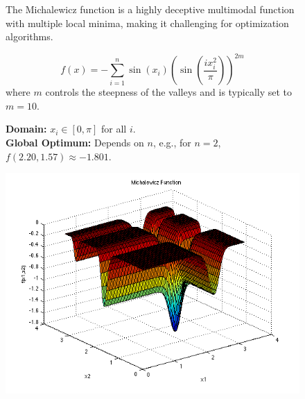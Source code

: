 \begin{figure}[H]
    \centering
    \begin{minipage}{0.65\textwidth}
        The Michalewicz function is a highly deceptive multimodal function with multiple local minima, making it challenging for optimization algorithms.
        
        \begin{equation}
            f(x) = -\sum_{i=1}^{n} \sin(x_i) \left(\sin\left(\frac{i x_i^2}{\pi}\right)\right)^{2m}
        \end{equation}
        where \( m \) controls the steepness of the valleys and is typically set to \( m = 10 \).

        \textbf{Domain:} \( x_i \in [0, \pi] \) for all \( i \). \\
        \textbf{Global Optimum:} Depends on \( n \), e.g., for \( n = 2 \), \( f(2.20, 1.57) \approx -1.801 \).
    \end{minipage}
    \hfill
    \begin{minipage}{0.3\textwidth}
        \centering
        \includegraphics[width=\textwidth]{figures/michalewicz_function.png}
        \label{fig:michalewicz}
    \end{minipage}
\end{figure}


